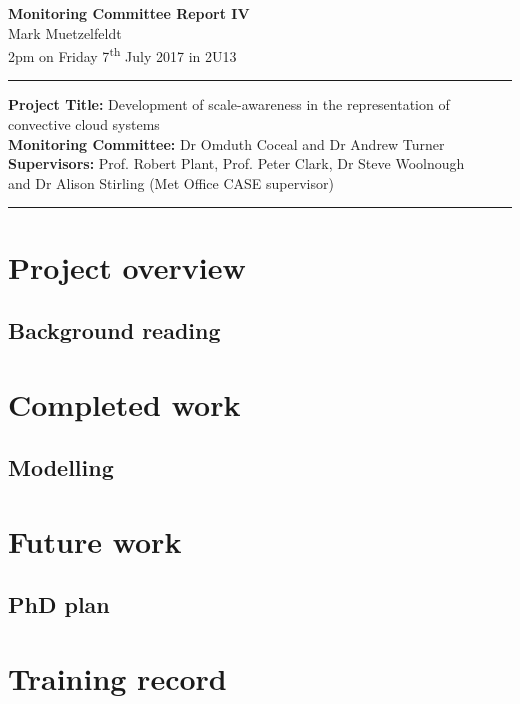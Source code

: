 \documentclass[11pt,a4paper]{article}
\newcommand{\ts}{\textsuperscript}
\begin{document}

\begin{center}
    \Large{\textbf{Monitoring Committee Report IV}}\\[0.1cm]
    \large{Mark Muetzelfeldt}\\
    \normalsize{2pm on Friday 7\ts{th} July 2017 in 2U13}\\[0.1cm]		
    \rule{\textwidth}{0.2mm}
    \textbf{Project Title: }Development of scale-awareness in the representation of
    convective cloud systems\\
    \textbf{Monitoring Committee: }Dr Omduth Coceal and  Dr Andrew Turner\\
    \textbf{Supervisors: }Prof. Robert Plant, Prof. Peter Clark, Dr Steve Woolnough \\
    and Dr Alison Stirling (Met Office CASE supervisor)\\
    \rule{\textwidth}{0.2mm}
\end{center}

\section{Project overview}
\label{sec:Project Overview}

\resetgeometry

\subsection{Background reading}

\section{Completed work}

\subsection{Modelling}
\label{sec:modelling}

\section{Future work}

\subsection{PhD plan}

\section{Training record}
\label{sec:Training record}
\end{document}
